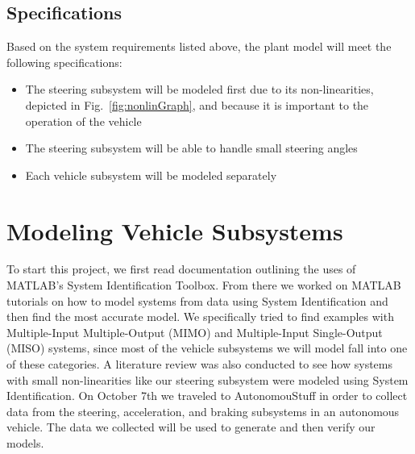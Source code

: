 \documentclass[journal,twoside,web]{ieeecolor}
\begin{document}
 \subsection{Specifications}
 Based on the system requirements listed above, the plant model will meet the following specifications:
 \begin{itemize}
    \item The steering subsystem will be modeled first due to its non-linearities, depicted in Fig.~\ref{fig:nonlinGraph}, and because it is important to the operation of the vehicle 
    \item The steering subsystem will be able to handle small steering angles
    \item Each vehicle subsystem will be modeled separately
 \end{itemize}

\section{Modeling Vehicle Subsystems}
To start this project, we first read documentation outlining the uses of
MATLAB's System Identification Toolbox. From there we worked on MATLAB tutorials
on how to model systems from data using System Identification and then find the
most accurate model. We specifically tried to find examples with Multiple-Input
Multiple-Output (MIMO) and Multiple-Input Single-Output (MISO) systems, since
most of the vehicle subsystems we will model fall into one of these categories.
A literature review was also conducted to see how systems with small
non-linearities like our steering subsystem were modeled using System
Identification. On October 7th we traveled to AutonomouStuff in order to collect
data from the steering, acceleration, and braking subsystems in an autonomous
vehicle. The data we collected will be used to generate and then verify our
models.
\end{document}

